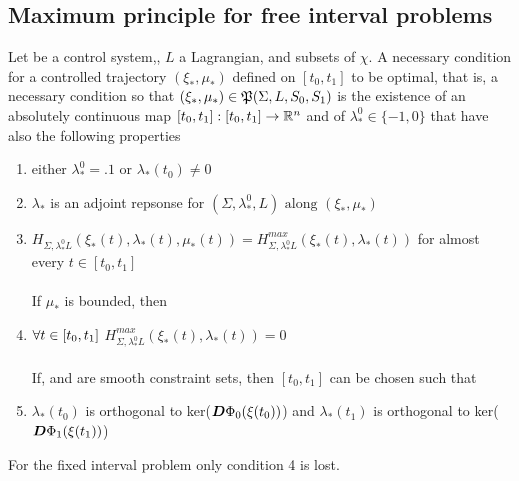 \subsection{Maximum principle for free interval problems}
Let \controlSystem be a control system,, $L$ a Lagrangian, \sz and \so subsets of $\chi$.
A necessary condition for a controlled trajectory $(\xi_*,\mu_*)$ defined on $[t_0,t_1]$  to be optimal, that is, a necessary condition so that $(\xi_*,\mu_*)\in\mathfrak{P}(\Sigma,L,S_0,S_1)$ is the existence of an absolutely continuous map $[t_0,t_1]:[t_0,t_1]\rightarrow\mathbb{R}^n$ and of  $\lambda_*^0\in\{-1,0\}$ that have also the following properties
\begin{enumerate}
	\item either $\lambda_*^0=.1$ or $\lambda_*(t_0)\ne0$
	\item $\lambda_*$ is an adjoint repsonse for $(\Sigma,\lambda_*^0,L)\text{ along }(\xi_*,\mu_*)$
	\item $H_{\Sigma,\lambda_*^0L}(\xi_*(t),\lambda_*(t),\mu_*(t))=H_{\Sigma,\lambda_*^0L}^{max}(\xi_*(t),\lambda_*(t))$ for almost every $t\in[t_0,t_1]$\\\\
	If $\mu_*$ is bounded, then 
	\item $\forall t\in[t_0,t_1]$  $H_{\Sigma,\lambda_*^0L}^{max}(\xi_*(t),\lambda_*(t))=0$\\\\
	
	If, \so and \sz are smooth constraint sets, then $[t_0,t_1]$ can be chosen such that 
	\item $\lambda_*(t_0)$ is orthogonal to ker($\boldsymbol{D}\Phi_0(\xi(t_0))$) and $\lambda_*(t_1)$ is orthogonal to ker($\boldsymbol{D}\Phi_1(\xi(t_1))$)
\end{enumerate}
For the fixed interval problem only condition 4 is lost.

